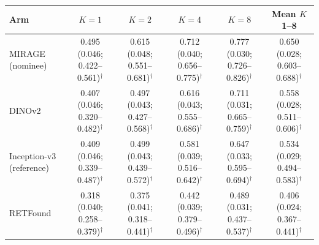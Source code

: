 \begin{tabular}{@{}lccccc@{}}
\toprule
Arm & $K=1$ & $K=2$ & $K=4$ & $K=8$ & Mean $K$ 1--8 \\
\midrule
MIRAGE (nominee) & \makecell{0.495\\{\scriptsize (0.046; 0.422--0.561)$^\dagger$}} & \makecell{0.615\\{\scriptsize (0.048; 0.551--0.681)$^\dagger$}} & \makecell{0.712\\{\scriptsize (0.040; 0.656--0.775)$^\dagger$}} & \makecell{0.777\\{\scriptsize (0.030; 0.726--0.826)$^\dagger$}} & \makecell{0.650\\{\scriptsize (0.028; 0.603--0.688)$^\dagger$}} \\
DINOv2 & \makecell{0.407\\{\scriptsize (0.046; 0.320--0.482)$^\dagger$}} & \makecell{0.497\\{\scriptsize (0.043; 0.427--0.568)$^\dagger$}} & \makecell{0.616\\{\scriptsize (0.043; 0.555--0.686)$^\dagger$}} & \makecell{0.711\\{\scriptsize (0.031; 0.665--0.759)$^\dagger$}} & \makecell{0.558\\{\scriptsize (0.028; 0.511--0.606)$^\dagger$}} \\
Inception-v3 (reference) & \makecell{0.409\\{\scriptsize (0.046; 0.339--0.487)$^\dagger$}} & \makecell{0.499\\{\scriptsize (0.043; 0.439--0.572)$^\dagger$}} & \makecell{0.581\\{\scriptsize (0.039; 0.516--0.642)$^\dagger$}} & \makecell{0.647\\{\scriptsize (0.033; 0.595--0.694)$^\dagger$}} & \makecell{0.534\\{\scriptsize (0.029; 0.494--0.583)$^\dagger$}} \\
RETFound & \makecell{0.318\\{\scriptsize (0.040; 0.258--0.379)$^\dagger$}} & \makecell{0.375\\{\scriptsize (0.041; 0.318--0.441)$^\dagger$}} & \makecell{0.442\\{\scriptsize (0.039; 0.379--0.496)$^\dagger$}} & \makecell{0.489\\{\scriptsize (0.031; 0.437--0.537)$^\dagger$}} & \makecell{0.406\\{\scriptsize (0.024; 0.367--0.441)$^\dagger$}} \\

\end{tabular}

